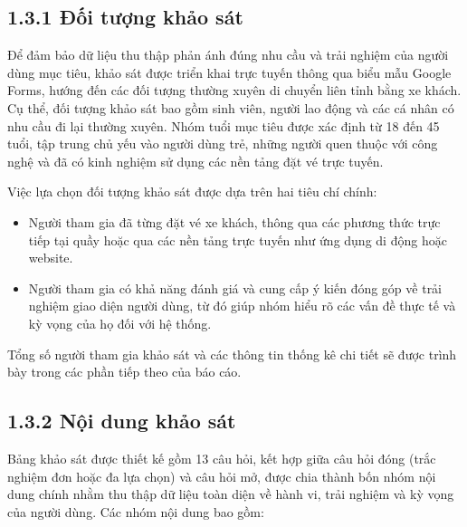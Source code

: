 \subsection*{1.3.1 Đối tượng khảo sát}
Để đảm bảo dữ liệu thu thập phản ánh đúng nhu cầu và trải nghiệm của người dùng mục tiêu, khảo sát được triển khai trực tuyến thông qua biểu mẫu Google Forms, hướng đến các đối tượng thường xuyên di chuyển liên tỉnh bằng xe khách. Cụ thể, đối tượng khảo sát bao gồm sinh viên, người lao động và các cá nhân có nhu cầu đi lại thường xuyên. Nhóm tuổi mục tiêu được xác định từ 18 đến 45 tuổi, tập trung chủ yếu vào người dùng trẻ, những người quen thuộc với công nghệ và đã có kinh nghiệm sử dụng các nền tảng đặt vé trực tuyến. 

Việc lựa chọn đối tượng khảo sát được dựa trên hai tiêu chí chính:
\begin{itemize}
    \item Người tham gia đã từng đặt vé xe khách, thông qua các phương thức trực tiếp tại quầy hoặc qua các nền tảng trực tuyến như ứng dụng di động hoặc website.
    \item Người tham gia có khả năng đánh giá và cung cấp ý kiến đóng góp về trải nghiệm giao diện người dùng, từ đó giúp nhóm hiểu rõ các vấn đề thực tế và kỳ vọng của họ đối với hệ thống.
\end{itemize}
Tổng số người tham gia khảo sát và các thông tin thống kê chi tiết sẽ được trình bày trong các phần tiếp theo của báo cáo.

\subsection*{1.3.2 Nội dung khảo sát}
Bảng khảo sát được thiết kế gồm 13 câu hỏi, kết hợp giữa câu hỏi đóng (trắc nghiệm đơn hoặc đa lựa chọn) và câu hỏi mở, được chia thành bốn nhóm nội dung chính nhằm thu thập dữ liệu toàn diện về hành vi, trải nghiệm và kỳ vọng của người dùng. Các nhóm nội dung bao gồm:

